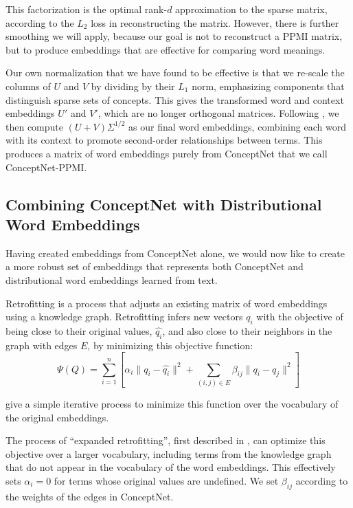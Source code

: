 \documentclass[letterpaper]{article}
\begin{document}
This factorization is the optimal rank-$d$ approximation to the sparse matrix,
according to the $L_2$ loss in reconstructing the matrix. However, there is
further smoothing we will apply, because our goal is not to reconstruct a PPMI
matrix, but to produce embeddings that are effective for comparing word
meanings.

Our own normalization that we have found to be effective is that we re-scale
the columns of $U$ and $V$ by dividing by their $L_1$ norm, emphasizing
components that distinguish sparse sets of concepts. This gives the transformed
word and context embeddings $U'$ and $V'$, which are no longer orthogonal
matrices. Following \citeauthor{levy2015embeddings}, we then compute $(U +
V)\Sigma^{1/2}$ as our final word embeddings, combining each word with its
context to promote second-order relationships between terms. This produces
a matrix of word embeddings purely from ConceptNet that we call ConceptNet-PPMI.

\subsection{Combining ConceptNet with Distributional Word Embeddings}

Having created embeddings from ConceptNet alone, we would now like to create
a more robust set of embeddings that represents both ConceptNet and distributional
word embeddings learned from text.

Retrofitting \cite{faruqui2015retrofitting} is a process that adjusts an
existing matrix of word embeddings using a knowledge graph. Retrofitting
infers new vectors $q_i$ with the objective of being close to their original
values, $\hat{q_i}$, and also close to their neighbors in the graph with edges $E$,
by minimizing this objective function:
$$\Psi(Q) = \sum_{i=1}^{n}\left[
    \alpha_i \lVert q_i - \hat{q_i} \rVert ^2 + \sum_{(i, j) \in E} \beta_{ij} \lVert q_i - q_j \rVert ^2
\right] $$

\citeauthor{faruqui2015retrofitting} give a simple iterative process to minimize
this function over the vocabulary of the original embeddings.

The process of ``expanded retrofitting'', first described in
\cite{speer2016ensemble}, can optimize this objective over a larger vocabulary,
including terms from the knowledge graph that do not appear in the vocabulary
of the word embeddings. This effectively sets $\alpha_i = 0$ for terms whose
original values are undefined. We set $\beta_{ij}$ according to the weights
of the edges in ConceptNet.
\end{document}
